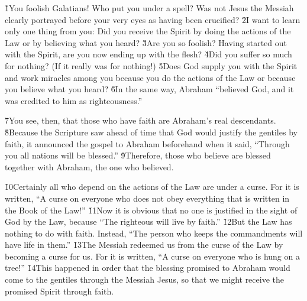 \v{1}You foolish Galatians! Who put you under a spell? Was not Jesus the Messiah clearly portrayed before your very eyes as having been crucified? \v{2}I want to learn only one thing from you: Did you receive the Spirit by doing the actions of the Law or by believing what you heard? \v{3}Are you so foolish? Having started out with the Spirit, are you now ending up with the flesh? \v{4}Did you suffer so much for nothing? (If it really was for nothing!) \v{5}Does God supply you with the Spirit and work miracles among you because you do the actions of the Law or because you believe what you heard? \v{6}In the same way, Abraham ``believed God, and it was credited to him as righteousness.''

\v{7}You see, then, that those who have faith are Abraham's real descendants. \v{8}Because the Scripture saw ahead of time that God would justify the gentiles by faith, it announced the gospel to Abraham beforehand when it said, ``Through you all nations will be blessed.'' \v{9}Therefore, those who believe are blessed together with Abraham, the one who believed.

\v{10}Certainly all who depend on the actions of the Law are under a curse. For it is written, ``A curse on everyone who does not obey everything that is written in the Book of the Law!'' \v{11}Now it is obvious that no one is justified in the sight of God by the Law, because ``The righteous will live by faith.'' \v{12}But the Law has nothing to do with faith. Instead, ``The person who keeps the commandments will have life in them.'' \v{13}The Messiah redeemed us from the curse of the Law by becoming a curse for us. For it is written, ``A curse on everyone who is hung on a tree!'' \v{14}This happened in order that the blessing promised to Abraham would come to the gentiles through the Messiah Jesus, so that we might receive the promised Spirit through faith.

